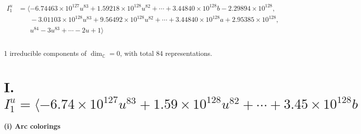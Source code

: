 \documentclass[1p]{elsarticle_modified}
\theoremstyle{definition}
\begin{document}
\begin{align*}
I^u_{1}&=\langle 
-6.74463\times10^{127} u^{83}+1.59218\times10^{128} u^{82}+\cdots+3.44840\times10^{128} b-2.29894\times10^{128},\\
\phantom{I^u_{1}}&\phantom{= \langle  }-3.01103\times10^{128} u^{83}+9.56492\times10^{128} u^{82}+\cdots+3.44840\times10^{128} a+2.95385\times10^{128},\\
\phantom{I^u_{1}}&\phantom{= \langle  }u^{84}-3 u^{83}+\cdots-2 u+1\rangle \\
\\
\end{align*}
\raggedright * 1 irreducible components of $\dim_{\mathbb{C}}=0$, with total 84 representations.\\
\newpage
\renewcommand{\arraystretch}{1}
\centering \section*{I. $I^u_{1}= \langle -6.74\times10^{127} u^{83}+1.59\times10^{128} u^{82}+\cdots+3.45\times10^{128} b-2.30\times10^{128},\;-3.01\times10^{128} u^{83}+9.56\times10^{128} u^{82}+\cdots+3.45\times10^{128} a+2.95\times10^{128},\;u^{84}-3 u^{83}+\cdots-2 u+1 \rangle$}
\flushleft \textbf{(i) Arc colorings}\\
\end{document}
